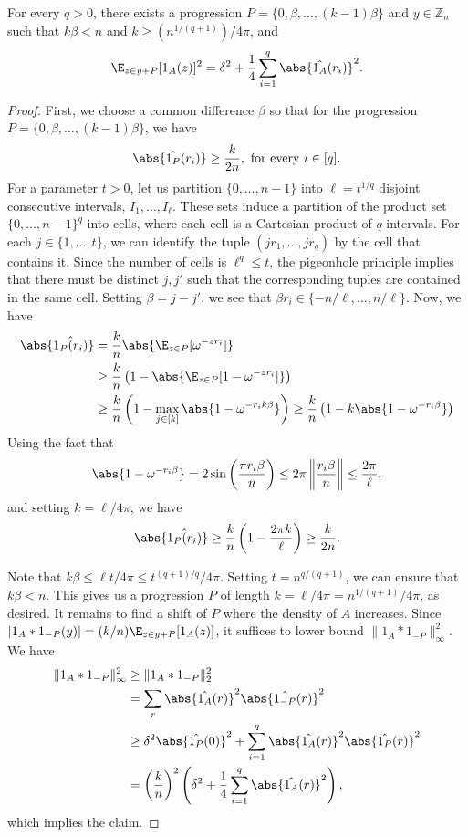 \documentclass{article}
\begin{document}
\begin{claim}
For every $q > 0$, there exists a progression $P = \{0,\beta,\ldots,(k-1)\beta\}$ and $y\in \mathbb{Z}_n$ such that $k\beta < n$ and $ k \geq (n^{1/(q+1)})/4\pi$, and 
$$\E_{z\in y+P}[1_{A}(z)]^2 = \delta^2 + \frac{1}{4}\sum_{i=1}^{q}\abs{\hat{1_{A}}(r_i)}^2.$$
\end{claim}
\begin{proof}
First, we choose a common difference $\beta$ so that for the progression $P = \{0,\beta,\ldots,(k-1)\beta\}$, we have $$\abs{\hat{1_P}(r_i)} \geq \frac{k}{2n}, \text{ for every } i \in [q].$$
For a parameter $t>0$, let us partition $\{0,\ldots,n-1\}$ into $\ell = t^{1/q}$ disjoint consecutive intervals, $I_1,\ldots,I_\ell$. These sets induce a partition of the product set $\{0,\ldots,n-1\}^q$ into cells, where each cell is a Cartesian product of $q$ intervals. For each $j\in \{1,\ldots,t\}$, we can identify the tuple $(jr_1,\ldots,jr_q)$ by the cell that contains it. Since the number of cells is $\ell^q \leq t$, the pigeonhole principle implies that there must be distinct $j,j'$ such that the corresponding tuples are contained in the same cell. Setting $\beta = j-j'$, we see that $\beta r_i \in \{-n/\ell,\ldots,n/\ell\}$. Now, we have
\begin{align*}
    \abs{\hat{1_{P}(r_i)}} &= \frac{k}{n}\abs{\E_{z\in P}[\omega^{-zr_i}]} \\
    &\geq \frac{k}{n}\left(1 - \abs{\E_{z\in P}[1 - \omega^{-zr_i}]}\right) \\
    &\geq \frac{k}{n}\left(1 - \max_{j\in [k]}\abs{1 - \omega^{-r_ik\beta}}\right) 
    \geq \frac{k}{n}\left(1 - k\abs{1 - \omega^{-r_i\beta}}\right) %
\end{align*}
Using the fact that $$\abs{1 - \omega^{-r_i\beta}} = 2\sin\left(\frac{\pi r_i\beta}{n}\right) \leq 2\pi\left\|\frac{r_i\beta}{n}\right\| \leq \frac{2\pi}{\ell},$$
and setting $k = \ell/4\pi$, we have $$\abs{\hat{1_{P}(r_i)}} \geq \frac{k}{n}\left(1 - \frac{2\pi k}{\ell}\right) \geq \frac{k}{2n}.$$

Note that $k\beta \leq \ell t/4\pi \leq t^{(q+1)/q}/4\pi$. Setting $t= n^{q/(q+1)}$, we can ensure that $k\beta < n$. This gives us a progression $P$ of length $k = \ell/4\pi = n^{1/(q+1)}/4\pi$, as desired. It remains to find a shift of $P$ where the density of $A$ increases. Since $|1_{A}\ast1_{-P}(y)| = (k/n)\E_{z\in y+P}[1_{A}(z)]$, it suffices to lower bound $\|1_{A}\ast1_{-P}\|_{\infty}^2$. We have
\begin{align*}
\|1_{A}\ast1_{-P}\|_{\infty}^2 &\geq \|1_{A}\ast1_{-P}\|_{2}^2 \\
&= \sum_{r}\abs{\hat{1_{A}}(r)}^2\abs{\hat{1_{-P}}(r)}^2 \\
&\geq \delta^2\abs{\hat{1_{P}}(0)}^2 + \sum_{i=1}^{q}\abs{\hat{1_{A}}(r)}^2\abs{\hat{1_{P}}(r)}^2 \\
&= \left(\frac{k}{n}\right)^2\left(\delta^2 + \frac{1}{4}\sum_{i=1}^{q}\abs{\hat{1_{A}}(r)}^2\right),
\end{align*}
which implies the claim.
\end{proof}
\end{document}
